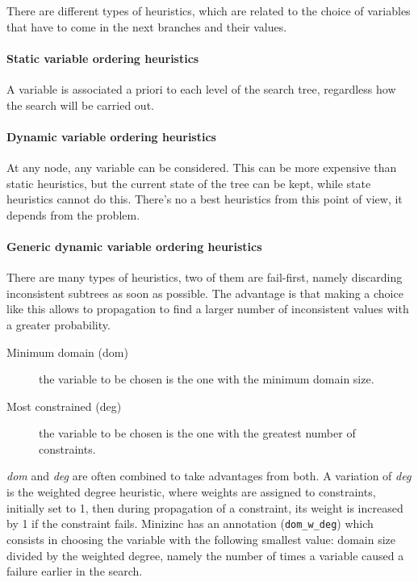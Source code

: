 \documentclass[10pt,a4paper]{article}
\begin{document}
There are different types of heuristics, which are related to the choice of
variables that have to come in the next branches and their values.

\paragraph{Static variable ordering heuristics}
A variable is associated a priori to each level of the search tree, regardless
how the search will be carried out.

\paragraph{Dynamic variable ordering heuristics}
At any node, any variable can be considered. This can be more expensive than
static heuristics, but the current state of the tree can be kept, while state
heuristics cannot do this. There's no a best heuristics from this point of view,
it depends from the problem.

\paragraph{Generic dynamic variable ordering heuristics}
There are many types of heuristics, two of them are fail-first, namely
discarding inconsistent subtrees as soon as possible. The advantage is that
making a choice like this allows to propagation to find a larger number of
inconsistent values with a greater probability.

\begin{description}
    \item[Minimum domain (dom)] the variable to be chosen is the one with the
    minimum domain size.
    \item[Most constrained (deg)] the variable to be chosen is the one with the
    greatest number of constraints.
\end{description}

\textit{dom} and \textit{deg} are often combined to take advantages from both.
A variation of \textit{deg} is the weighted degree heuristic, where weights are
assigned to constraints, initially set to 1, then during propagation of a
constraint, its weight is increased by 1 if the constraint fails. Minizinc has
an annotation (\texttt{dom\_w\_deg}) which consists in choosing the variable with
the following smallest value: domain size divided by the weighted degree, namely
the number of times a variable caused a failure earlier in the search.
\end{document}
